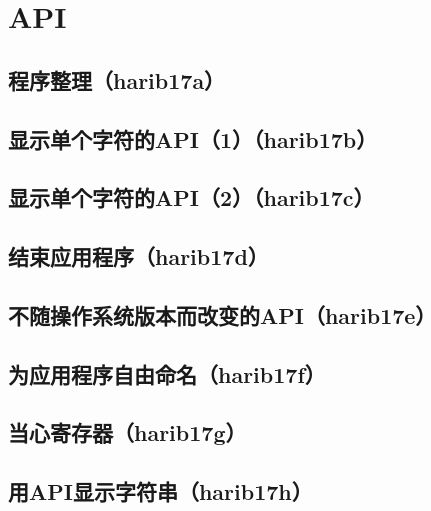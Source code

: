 ﻿\chapter{	API	}
\section{	程序整理（harib17a）	}
\section{	显示单个字符的API（1）（harib17b）	}
\section{	显示单个字符的API（2）（harib17c）	}
\section{	结束应用程序（harib17d）	}
\section{	不随操作系统版本而改变的API（harib17e）	}
\section{	为应用程序自由命名（harib17f）	}
\section{	当心寄存器（harib17g）	}
\section{	用API显示字符串（harib17h）	}


